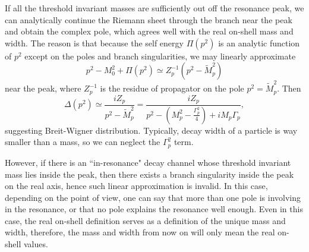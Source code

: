 \documentclass[11pt]{article}
\theoremstyle{definition}
\theoremstyle{remark}
\begin{document}
	If all the threshold invariant masses are sufficiently out off the resonance peak, we can analytically continue the Riemann sheet through the branch near the peak and obtain the complex pole, which agrees well with the real on-shell mass and width.
	The reason is that because the self energy $\Pi(p^{2})$ is an analytic function of $p^{2}$ except on the poles and branch singularities, we may linearly approximate
	\[p^{2}-M_{0}^{2}+\Pi(p^{2})\simeq Z_{p}^{-1}(p^{2}-\tilde{M}_{p}^{2})\]
	near the peak, where $Z_{p}^{-1}$ is the residue of propagator on the pole $p^{2}=\tilde{M}_{p}^{2}$.
	Then
	\[\Delta(p^{2})\simeq\frac{iZ_{p}}{p^{2}-\tilde{M}_{p}^{2}}=\frac{iZ_{p}}{p^{2}-(M_{p}^{2}-\frac{\Gamma_{p}^{2}}{4})+iM_{p}\Gamma_{p}},\]
	suggesting Breit-Wigner distribution.
	Typically, decay width of a particle is way smaller than a mass, so we can neglect the $\Gamma_{p}^{2}$ term.
	
	However, if there is an ``in-resonance" decay channel whose threshold invariant mass lies inside the peak, then there exists a branch singularity inside the peak on the real axis, hence such linear approximation is invalid.
	In this case, depending on the point of view, one can say that more than one pole is involving in the resonance, or that no pole explains the resonance well enough.
	Even in this case, the real on-shell definition serves as a definition of the unique mass and width, therefore, the mass and width from now on will only mean the real on-shell values.
	
\end{document}
